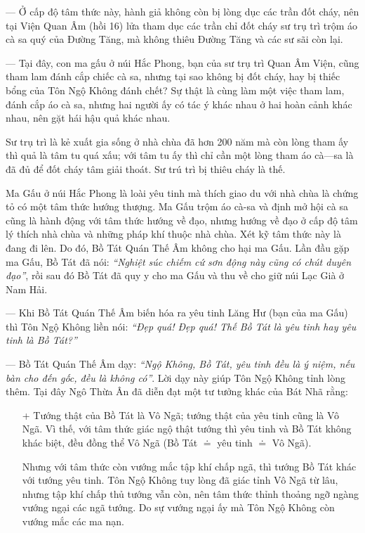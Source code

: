 — Ở cấp độ tâm thức này, hành giả không còn bị lòng dục các trần đốt cháy, nên tại Viện Quan Âm (hồi 16) lửa tham dục các trần chỉ đốt cháy sư trụ trì trộm áo cà sa quý của Đường Tăng, mà không thiêu Đường Tăng và các sư sãi còn lại.

— Tại đây, con ma gấu ở núi Hắc Phong, bạn của sư trụ trì Quan Âm Viện, cũng tham lam đánh cắp chiếc cà sa, nhưng tại sao không bị đốt cháy, hay bị thiếc bổng của Tôn Ngộ Không đánh chết? Sự thật là cùng làm một việc tham lam, đánh cắp áo cà sa, nhưng hai người ấy có tác ý khác nhau ở hai hoàn cảnh khác nhau, nên gặt hái hậu quả khác nhau.

Sư trụ trì là kẻ xuất gia sống ở nhà chùa đã hơn 200 năm mà còn lòng tham ấy thì quả là tâm tu quá xấu; với tâm tu ấy thì chỉ cần một lòng tham áo cà—sa là đã đủ để đốt cháy tâm giải thoát. Sư trú trì bị thiêu cháy là thế.

Ma Gấu ở núi Hắc Phong là loài yêu tinh mà thích giao du với nhà chùa là chứng tỏ có một tâm thức hướng thượng. Ma Gấu trộm áo cà-sa và định mở hội cà sa cũng là hành động với tâm thức hướng về đạo, nhưng hướng về đạo ở cấp độ tâm lý thích nhà chùa và những pháp khí thuộc nhà chùa. Xét kỹ tâm thức này là đang đi lên. Do đó, Bồ Tát Quán Thế Âm không cho hại ma Gấu. Lần đầu gặp ma Gấu, Bồ Tát đã nói: \emph{``Nghiệt súc chiếm cứ sơn động này cũng có chút duyên đạo''}, rồi sau đó Bồ Tát đã quy y cho ma Gấu và thu về cho giữ núi Lạc Già ở Nam Hải.

— Khi Bồ Tát Quán Thế Âm biến hóa ra yêu tinh Lăng Hư (bạn của ma Gấu) thì Tôn Ngộ Không liền nói: \emph{``Đẹp quá! Đẹp quá! Thế Bồ Tát là yêu tinh hay yêu tinh là Bồ Tát?''}

— Bồ Tát Quán Thế Âm dạy: \emph{``Ngộ Không, Bồ Tát, yêu tinh đều là ý niệm, nếu bàn cho đến gốc, đều là không có''}. Lời dạy này giúp Tôn Ngộ Không tỉnh lòng thêm. Tại đây Ngô Thừa Ân đã diễn đạt một tư tưởng khác của Bát Nhã rằng:

\begin{enumerate}[label=\itshape\arabic*\upshape/]
    \item[+] Tướng thật của Bồ Tát là Vô Ngã; tướng thật của yêu tinh cũng là Vô Ngã. Vì thế, với tâm thức giác ngộ thật tướng thì yêu tinh và Bồ Tát không khác biệt, đều đồng thể Vô Ngã (Bồ Tát $\doteq$ yêu tinh $\doteq$ Vô Ngã).

    Nhưng với tâm thức còn vướng mắc tập khí chấp ngã, thì tướng Bồ Tát khác với tướng yêu tinh. Tôn Ngộ Không tuy lòng đã giác tỉnh Vô Ngã từ lâu, nhưng tập khí chấp thủ tướng vẫn còn, nên tâm thức thỉnh thoảng ngỡ ngàng vướng ngại các ngã tướng. Do sự vướng ngại ấy mà Tôn Ngộ Không còn vướng mắc các ma nạn.
\end{enumerate}

